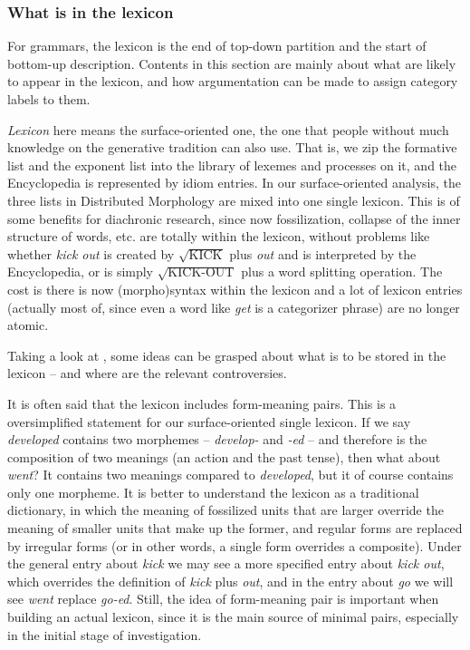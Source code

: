 \documentclass[UTF8, a4paper, oneside, scheme=plain]{ctexart}
\newcommand*{\term}[1]{\emph{#1}}
\newcommand*{\corpus}[1]{\emph{#1}}
\begin{document}
\subsubsection{What is in the lexicon}

For grammars, the lexicon is the end of top-down partition
and the start of bottom-up description.
Contents in this section are mainly about what are likely to appear in the lexicon,
and how argumentation can be made to assign category labels to them.

\term{Lexicon} here means the surface-oriented one,
the one that people without much knowledge on the generative tradition can also use.
That is, we zip the formative list and the exponent list into 
the library of lexemes and processes on it,
and the Encyclopedia is represented by idiom entries.
In our surface-oriented analysis,
the three lists in Distributed Morphology are mixed into one single lexicon.
This is of some benefits for diachronic research,
since now fossilization, collapse of the inner structure of words, etc. 
are totally within the lexicon,
without problems like whether 
\corpus{kick out} is created by $\sqrt{\text{KICK}}$ plus \corpus{out}
and is interpreted by the Encyclopedia,
or is simply $\sqrt{\text{KICK-OUT}}$ plus a word splitting operation.
The cost is there is now (morpho)syntax within the lexicon
and a lot of lexicon entries 
(actually most of, since even a word like \corpus{get} is a categorizer phrase)
are no longer atomic.

Taking a look at ,
some ideas can be grasped about what is to be stored in the lexicon
-- and where are the relevant controversies.


It is often said that the lexicon includes form-meaning pairs.
This is a oversimplified statement
for our surface-oriented single lexicon.
If we say \corpus{developed} contains two morphemes -- 
\corpus{develop-} and \corpus{-ed} --
and therefore is the composition of two meanings 
(an action and the past tense),
then what about \corpus{went}?
It contains two meanings compared to \corpus{developed},
but it of course contains only one morpheme.
It is better to understand the lexicon as a traditional dictionary,
in which the meaning of fossilized units that are larger 
override the meaning of smaller units that make up the former,
and regular forms are replaced by irregular forms
(or in other words,
a single form overrides a composite).
Under the general entry about \corpus{kick}
we may see a more specified entry about \corpus{kick out},
which overrides the definition of \corpus{kick} plus \corpus{out},
and in the entry about \corpus{go} we will see \corpus{went} replace \corpus{go-ed}.
Still, the idea of form-meaning pair is important when building an actual lexicon,
since it is the main source of minimal pairs,
especially in the initial stage of investigation.
\end{document}
